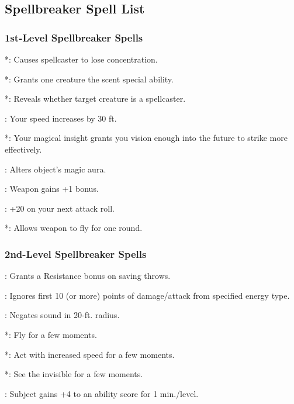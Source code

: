 \subsection{Spellbreaker Spell List}
\subsubsection{1st-Level Spellbreaker Spells}
\begin{list}{}{\leftmargin=1em}
  \item {}*: Causes spellcaster to lose concentration.
  \item {}*: Grants one creature the scent special ability.
  \item {}*: Reveals whether target creature is a spellcaster.
  \item {}: Your speed increases by 30 ft.
  \item {}*: Your magical insight grants you vision enough into the future to strike more effectively.
  \item {}: Alters object's magic aura.
  \item {}: Weapon gains +1 bonus.
  \item {}: +20 on your next attack roll.
  \item {}*: Allows weapon to fly for one round.
\end{list}
\subsubsection{2nd-Level Spellbreaker Spells}
\begin{list}{}{\leftmargin=1em}
  \item {} : Grants a Resistance bonus on saving throws.
  \item {}: Ignores first 10 (or more) points of damage/attack from specified energy type.
  \item {}: Negates sound in 20-ft. radius.
  \item {}*: Fly for a few moments.
  \item {}*: Act with increased speed for a few moments.
  \item {}*: See the invisible for a few moments.
  \item {}: Subject gains +4 to an ability score for 1 min./level.
\end{list}
